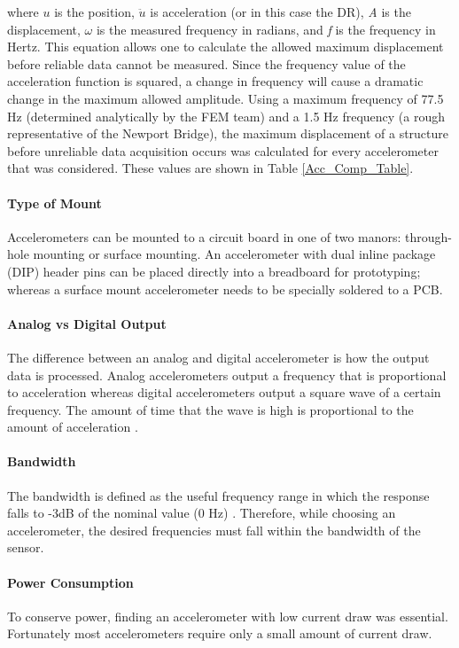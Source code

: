 \noindent where $u$ is the position, $\ddot{u}$ is acceleration (or in this case the DR), \textit{A} is the displacement, $\omega$ is the measured frequency in radians, and \textit{f} is the frequency in Hertz.  This equation allows one to calculate the allowed maximum displacement before reliable data cannot be measured.  Since the frequency value of the acceleration function is squared, a change in frequency will cause a dramatic change in the maximum allowed amplitude.  Using a maximum frequency of 77.5 Hz (determined analytically by the FEM team) and a 1.5 Hz frequency (a rough representative of the Newport Bridge), the maximum displacement of a structure before unreliable data acquisition occurs was calculated for every accelerometer that was considered.  These values are shown in Table \ref{Acc_Comp_Table}.

\paragraph{Type of Mount}
\indent Accelerometers can be mounted to a circuit board in one of two manors: through-hole mounting or surface mounting.  An accelerometer with dual inline package (DIP) header pins can be placed directly into a breadboard for prototyping; whereas a surface mount accelerometer needs to be specially soldered to a PCB.
\paragraph{Analog vs Digital Output}
\indent The difference between an analog and digital accelerometer is how the output data is processed.  Analog accelerometers output a frequency that is proportional to acceleration whereas digital accelerometers output a square wave of a certain frequency.  The amount of time that the wave is high is proportional to the amount of acceleration \cite{DimensionEngineering}. 
\paragraph{Bandwidth}
\indent The bandwidth is defined as the useful frequency range in which the response falls to -3dB of the nominal value (0 Hz) \cite{MSY.SivaPrasad:2011}.  Therefore, while choosing an accelerometer, the desired frequencies must fall within the bandwidth of the sensor.   
\paragraph{Power Consumption}
\indent To conserve power, finding an accelerometer with low current draw was essential.  Fortunately most accelerometers require only a small amount of current draw.


